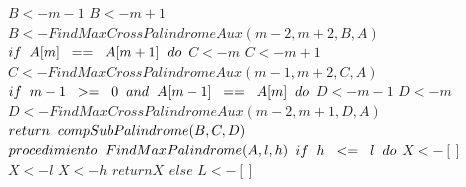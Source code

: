 \documentclass{article}
\begin{document}
\indent\indent\(B<-m-1\)\newline
\indent\indent\(B<-m+1\)\newline
\indent\indent\(B<-FindMaxCrossPalindromeAux(m-2,m+2,B,A)\)\newline
\indent\(if\hspace{0,2cm}A[m]\hspace{0,2cm}==\hspace{0,2cm}A[m+1]\hspace{0,2cm}do\)\newline
\indent\indent\(C<-m\)\newline
\indent\indent\(C<-m+1\)\newline
\indent\indent\(C<-FindMaxCrossPalindromeAux(m-1,m+2,C,A)\)\newline
\indent\(if\hspace{0,2cm}m-1\hspace{0,2cm}>=\hspace{0,2cm}0\hspace{0,2cm}and\hspace{0,2cm}A[m-1]\hspace{0,2cm}==\hspace{0,2cm}A[m]\hspace{0,2cm}do\)\newline
\indent\indent\(D<-m-1\)\newline
\indent\indent\(D<-m\)\newline
\indent\indent\(D<-FindMaxCrossPalindromeAux(m-2,m+1,D,A)\)\newline
\indent\(return\hspace{0,2cm}compSubPalindrome(B,C,D)\)\newline
\newline
\(procedimiento\hspace{0,2cm}FindMaxPalindrome(A,l,h)\)\newline
\indent\(if\hspace{0,2cm}h\hspace{0,2cm}<=\hspace{0,2cm}l\hspace{0,2cm}do\)\newline
\indent\indent\(X<-[]\)\newline
\indent\indent\(X<-l\)\newline
\indent\indent\(X<-h\)\newline
\indent\indent\(return X\)\newline
\indent\(else\)\newline
\indent\indent\(L<-[]\)\newline
\end{document}
